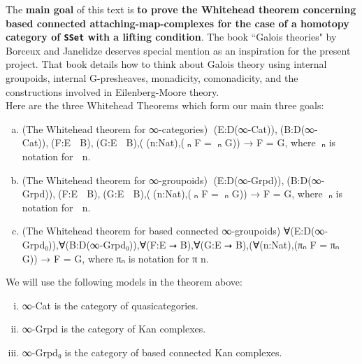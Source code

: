 \documentclass{book}
\theoremstyle{definition}
\begin{document}
The {\bf main goal} of this text is {\bf to prove the Whitehead theorem concerning based connected attaching-map-complexes for the case of a homotopy category of \texttt{SSet} with a lifting condition}. The book ``Galois theories" by Borceux and Janelidze deserves special mention as an inspiration for the present project. That book details how to think about Galois theory using internal groupoids, internal G-presheaves, monadicity, comonadicity, and the constructions involved in Eilenberg-Moore theory.\\

Here are the three Whitehead Theorems which form our main three goals:

\begin{enumerate}[(a)]
\item (The Whitehead theorem for ∞-categories) ∀(E:D⃗(∞-Cat)),∀(B:D⃗(∞-Cat)),∀(F:E ⭢ B),∀(G:E ⭢ B),(∀(n:Nat),(π⃗ₙ F = π⃗ₙ G)) → F = G, where π⃗ₙ is notation for π⃗ n.
\item (The Whitehead theorem for ∞-groupoids) ∀(E:D⃡(∞-Grpd)),∀(B:D⃡(∞-Grpd)),∀(F:E ⭢ B),∀(G:E ⭢ B),(∀(n:Nat),(π⃡ₙ F = π⃡ₙ G)) → F = G, where π⃡ₙ is notation for π⃡ n.
\item (The Whitehead theorem for based connected ∞-groupoids) ∀(E:D(∞-Grpd₀)),∀(B:D(∞-Grpd₀)),∀(F:E ⭢ B),∀(G:E ⭢ B),(∀(n:Nat),(πₙ F = πₙ G)) → F = G, where πₙ is notation for π n.
\end{enumerate}

We will use the following models in the theorem above:

\begin{enumerate}[(i)]
\item ∞-Cat is the category of quasicategories.
\item ∞-Grpd is the category of Kan complexes.
\item ∞-Grpd₀ is the category of based connected Kan complexes.
\end{enumerate}
\end{document}
